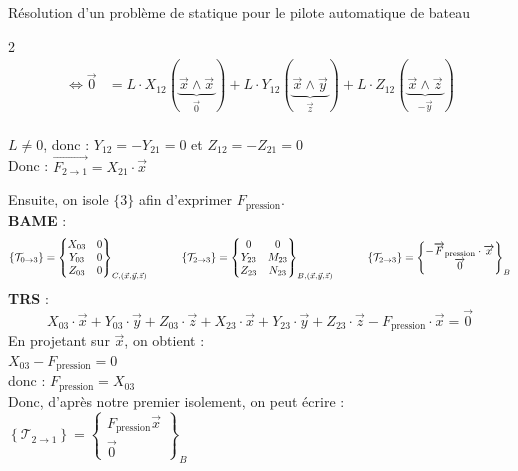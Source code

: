 \documentclass{article} %
\begin{document}
{\begin{exemple}{Résolution d'un problème de 
statique pour le pilote automatique de bateau}
\begin{multicols}{2}
\begin{align*}
\iff \overrightarrow{0} &= L \cdot X_{12} (\underbrace{\overrightarrow{x} \wedge \overrightarrow{x}}_{\overrightarrow{0}}) + L \cdot Y_{12} (\underbrace{\overrightarrow{x} \wedge \overrightarrow{y}}_{\overrightarrow{z}}) + L \cdot Z_{12} (\underbrace{\overrightarrow{x} \wedge \overrightarrow{z}}_{-\overrightarrow{y}})
\end{align*}\vspace*{-17pt}\\
$L\neq 0$, donc : $Y_{12}=-Y_{21}=0$ et $Z_{12}=-Z_{21}=0$\\
Donc : $\overrightarrow{F_{2\to 1}}=X_{21}\cdot\overrightarrow{x}$
\end{multicols}
Ensuite, on isole \textcolor{mybrown!90!red!60!black}{$\{$3$\}$} afin d'exprimer 
$F_{\text{pression}}$.\\
\textbf{BAME} :
$$\{\mathcal{T}_{0 \to 3}\} = \begin{Bmatrix} X_{03} & 0 \\ Y_{03} & 0 \\ Z_{03} & 0 \end{Bmatrix}_{C, (\vec{x}, \vec{y}, \vec{z})} \hspace*{30pt} \{\mathcal{T}_{2 \to 3}\} = \begin{Bmatrix} 0 & 0 \\ Y_{23} & M_{23} \\ Z_{23} & N_{23} \end{Bmatrix}_{B, (\vec{x}, \vec{y}, \vec{z})} \hspace*{30pt} \left\{ \mathcal{T}_{2 \to 3} \right\} = \begin{Bmatrix} -\overrightarrow{F}_{\text{pression}}\cdot \overrightarrow{x} \\ \overrightarrow{0} \end{Bmatrix}_{B}$$
\textbf{TRS} :
$$X_{03}\cdot \overrightarrow{x}+Y_{03}\cdot \overrightarrow{y}+Z_{03}\cdot \overrightarrow{z}+X_{23}\cdot \overrightarrow{x}+Y_{23}\cdot \overrightarrow{y}+Z_{23}\cdot \overrightarrow{z}-F_\text{pression}\cdot \overrightarrow{x}=\overrightarrow{0}$$
En projetant sur $\overrightarrow{x}$, on obtient :\\
$X_{03}-F_\text{pression}=0$\\donc : $F_\text{pression}=X_{03}$\\
Donc, d'après notre premier isolement, on peut écrire : $\left\{ \mathcal{T}_{2 \to 1} \right\} = \begin{Bmatrix} F_\text{pression}\overrightarrow{x} \\ \overrightarrow{0} \end{Bmatrix}_{B}$\\

\end{exemple}}
\end{document}
